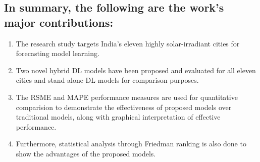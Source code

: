 \subsection{In summary, the following are the work's major contributions:}
\begin{enumerate}
\item The research study targets India's eleven highly solar-irradiant cities for forecasting model learning.
\item  Two novel hybrid DL models have been proposed and evaluated for all eleven cities and stand-alone DL models for comparison purposes. 
\item The RSME and MAPE performance measures are used for quantitative comparision to demonstrate the effectiveness of proposed models over traditional models, along with graphical interpretation of effective performance. 
\item Furthermore, statistical analysis through Friedman ranking is also done to show the advantages of the proposed models. 
\end{enumerate}